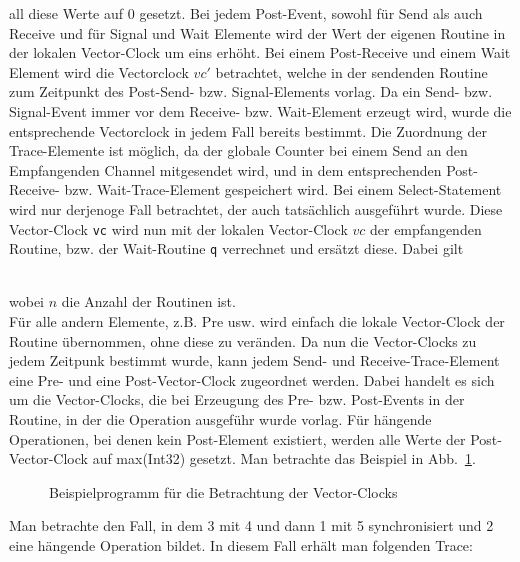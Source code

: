all diese Werte auf 0 gesetzt. Bei jedem Post-Event, sowohl für Send als auch Receive und für 
Signal und Wait Elemente wird der Wert der eigenen Routine in der lokalen Vector-Clock um eins 
erhöht. Bei einem Post-Receive und einem Wait Element wird die Vectorclock $vc'$ betrachtet, 
welche in der sendenden Routine zum Zeitpunkt des Post-Send- bzw. Signal-Elements vorlag. 
Da ein Send- bzw. Signal-Event immer vor dem Receive- bzw. Wait-Element erzeugt wird, wurde 
die entsprechende Vectorclock in jedem Fall bereits bestimmt. Die Zuordnung der Trace-Elemente 
ist möglich, da der globale Counter bei einem Send an den Empfangenden Channel mitgesendet 
wird, und in dem entsprechenden Post-Receive- bzw. Wait-Trace-Element gespeichert wird.
Bei einem Select-Statement wird nur derjenoge Fall betrachtet, der auch tatsächlich ausgeführt wurde.
Diese Vector-Clock \texttt{vc}
wird nun mit der lokalen Vector-Clock $vc$ der empfangenden Routine, bzw. der Wait-Routine 
\texttt{q} verrechnet und ersätzt diese. Dabei gilt\\
\begin{figure}[h]
  \centering
\end{figure}\\
wobei $n$ die Anzahl der Routinen ist.\\
Für alle andern Elemente, z.B. Pre usw. wird einfach die lokale Vector-Clock der Routine übernommen, 
ohne diese zu veränden. Da nun die Vector-Clocks zu jedem Zeitpunk bestimmt wurde, kann jedem 
Send- und Receive-Trace-Element eine Pre- und eine Post-Vector-Clock zugeordnet werden. 
Dabei handelt es sich um die Vector-Clocks, die bei Erzeugung des Pre- bzw. Post-Events in 
der Routine, in der die Operation ausgeführ wurde vorlag. Für hängende Operationen, 
bei denen kein Post-Element existiert, werden alle Werte der Post-Vector-Clock auf 
max(Int32) gesetzt.
Man betrachte das Beispiel in Abb.~\ref{Chap:Analyze-Sec:Channel-SubSec:Dangling-Fig:PorgVC}.
\begin{figure}[h!]
  \centering
  \caption{Beispielprogramm für die Betrachtung der Vector-Clocks}
  \label{Chap:Analyze-Sec:Channel-SubSec:Dangling-Fig:PorgVC}
\end{figure}
Man betrachte den Fall, in dem 3 mit 4 und dann 1 mit 5 synchronisiert und 2 eine hängende Operation bildet.
In diesem Fall erhält man folgenden Trace:
